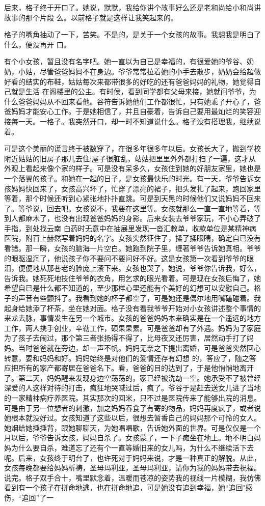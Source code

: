 \documentclass{article}
\begin{document}
后来，格子终于开口了。她说，默默，我给你讲个故事好么还是老和尚给小和尚讲故事的那个片段
么。以前格子就是这样让我笑起来的。 

格子的嘴角抽动了一下，苦笑。不是的，是关于一个女孩的故事。我想我是明白了什么，便没再开
口。 

有个小女孩，暂且没有名字吧。她一直以为自已是幸福的，有很爱她的爷谷、奶奶，小姑，尽管爸爸妈妈不在身边。爷爷常常拉着她的小手去散步，奶奶会给超做好看的结实的布鞋，姑姑每次来都带很多的好吃的还有爸爸妈妈的礼物，她觉得自己就是生活
\newpage
在阁楼里的公主。有时侯，看到同学都有父母来接，她就问爷爷，为什么爸爸妈妈从不回来看他。谷符告诉她他们工作都很忙，只有她乖了开心了，爸爸妈妈才能安心工作。于是她相信了，并且自豪着，告诉自己要用最灿烂的笑容迎接每一天。一格子。我突然开口，却一时不知道说什么。格子没有搭理我，继续说
着。 

可是这个美丽的谎言终于被数穿了，在很多年很多年以后。女孩长大了，搬到学校附近姑姑的旧房子那儿去住:屋子很脏乱，站姑把里里外外都打扫了一遍，这才从外观上看起来像个家的样子。可是没有呆多久，女孩住到她的好朋友家里，她也是一个落翼的孩子。和她在一起的日子，是女孩最快乐的时光。有一天，爷爷告诉女孩妈妈快回来了，女孩高兴坏了，忙穿了漂亮的裙子，把头发扎了起来，跑回家里等着，那个时候还听到心紧张地扑扑直跳。可是到天黑的时候他们又说妈妈不回来了。等爷说，回去吧。女孩说不，我要在这里等。女孩就那么一直一直地等着，等到人都麻木了，也没有出现爸爸妈妈的身影。后来女装去爷爷家玩，不小心弄破了手指，到处找云南
\newpage
白药时无意中在抽展里发现一沓汇教单，收款单位是某精神病医院，附百上赫然写着妈妈的名字。女孩突然征住了，揉了揉眼睛，确定自已没有看错。那一瞬，女孩的脑海一片空白。她跑到院子里，缠著爷爷告诉她真相。爷爷的眼驱湿润了，他说孩子你不要问不要问好不好。这是女孩第一次看到爷爷的眼泪，便便地从那苍老的脸庞上滚下来。女孩也哭了，她说，爷爷你告诉我，好么，告诉我。她死死地技住爷爷的衣角，用乞求的眼光看着。可是现在女孩后悔了，她希望自已是什么都不知道的，至少那样心里还能有个美好的幻想可以安慰自己。格子的声音有些颤抖了。我看到她的杯子都空了，可是她还是偶尔地用嘴磕碰着。我起身给她添了杯茶，坐在她对面。格子没有看我爷爷开始对小女孩讲述整个事情的来龙去脉，事情发生在另一个城市。女孩的爸爸妈妈本来确实是在一个遥远的地方工作，两人携手创业，辛勒工作，硕果果累。可是爸爸却有了外遇。妈妈为了家庭为了孩子去闹过，那个第三者张扬得不得了，比母夜叉还厉害，居然动手打了妈妈。当时爸爸就在旁边，却一声不帆。妈妈无奈之下提出离婚，可是爸爸突然回心转意，要和妈妈和好。妈妈始终是对他们的爱情还存有幻想
\newpage
的，答应了，随之答应把所有的家产都寄居在爸爸名下。看，爸爸的目的达到了，于是他悄悄地离开了。第二天，妈妈醒来发现身边空荡荡的，家已经被洗劫一空。她承受不了被曾经深爱的人这样对待的打击，疯狂地哭喊过后，疯了。爷谷于是赶去送女儿进了当地的一家精神病疗养医院。其实那次的回米，只不过是医院传来了能够出院的消息。可是由于另一位想者的刺激，加之妈妈吞食了有寄的物品，妈妈再度疯了，或者说她根本就没好过。女孩知道了这些以后，很想去暂香自己的妈妈那个可怜的女人。她烟给她捶捶背，跟她聊聊天，为她唱唱歌，告诉她外面的世界。可是仅仅是一个月以后，爷爷告诉女孩，妈妈自杀了。女孩蒙了，一下子瘫坐在地上。地不明白妈妈为什么要自杀，难道忘了还有个一直等婚旧来的女儿吗，为什么不继续活下去呢。后来，女孩终于明台了，也许死对于妈妈来说，才是一种真正的解脱。从此，女孩每晚都要给妈妈析祷，圣母玛利亚，圣母玛利亚，请你为我的妈妈带去祝福。说完。格子双手合十，嘴里默念着，温暖而苍凉的姿势我的视线一片模糊，我仿佛看到有一个孩子在拼命地逃，也在拼命地追，可是她没有追到幸福，她“追回"感伤，“追回”了一
\end{document}
